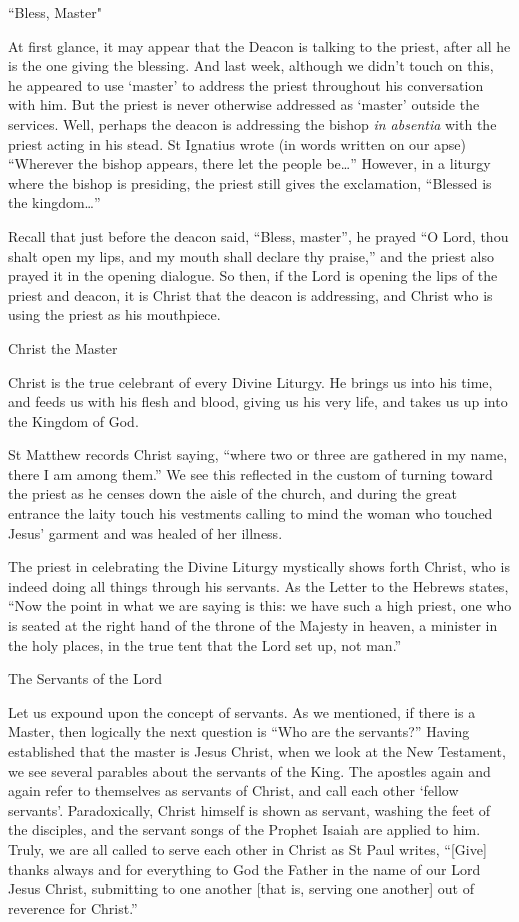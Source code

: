 \documentclass[
]{article}
\begin{document}
``Bless, Master"

At first glance, it may appear that the Deacon is talking to the priest,
after all he is the one giving the blessing. And last week, although we
didn't touch on this, he appeared to use `master' to address the priest
throughout his conversation with him. But the priest is never otherwise
addressed as `master' outside the services. Well, perhaps the deacon is
addressing the bishop \emph{in absentia} with the priest acting in his
stead. St Ignatius wrote (in words written on our apse) ``Wherever the
bishop appears, there let the people be\ldots{}'' However, in a liturgy
where the bishop is presiding, the priest still gives the exclamation,
``Blessed is the kingdom\ldots{}''

Recall that just before the deacon said, ``Bless, master'', he prayed
``O Lord, thou shalt open my lips, and my mouth shall declare thy
praise,'' and the priest also prayed it in the opening dialogue. So
then, if the Lord is opening the lips of the priest and deacon, it is
Christ that the deacon is addressing, and Christ who is using the priest
as his mouthpiece.

Christ the Master

Christ is the true celebrant of every Divine Liturgy. He brings us into
his time, and feeds us with his flesh and blood, giving us his very
life, and takes us up into the Kingdom of God.

St Matthew records Christ saying, ``where two or three are gathered in
my name, there I am among them.'' We see this reflected in the custom of
turning toward the priest as he censes down the aisle of the church, and
during the great entrance the laity touch his vestments calling to mind
the woman who touched Jesus' garment and was healed of her illness.

The priest in celebrating the Divine Liturgy mystically shows forth
Christ, who is indeed doing all things through his servants. As the
Letter to the Hebrews states, ``Now the point in what we are saying is
this: we have such a high priest, one who is seated at the right hand of
the throne of the Majesty in heaven, a minister in the holy places, in
the true tent that the Lord set up, not man.''

The Servants of the Lord

Let us expound upon the concept of servants. As we mentioned, if there
is a Master, then logically the next question is ``Who are the
servants?'' Having established that the master is Jesus Christ, when we
look at the New Testament, we see several parables about the servants of
the King. The apostles again and again refer to themselves as servants
of Christ, and call each other `fellow servants'. Paradoxically, Christ
himself is shown as servant, washing the feet of the disciples, and the
servant songs of the Prophet Isaiah are applied to him. Truly, we are
all called to serve each other in Christ as St Paul writes, ``{[}Give{]}
thanks always and for everything to God the Father in the name of our
Lord Jesus Christ, submitting to one another {[}that is, serving one
another{]} out of reverence for Christ.''
\end{document}
